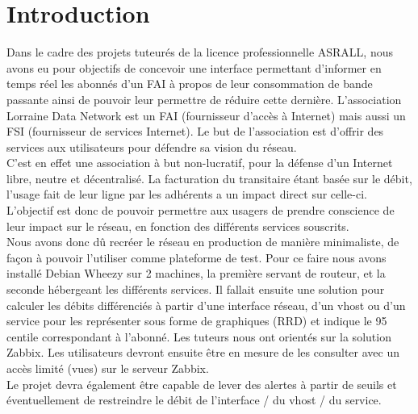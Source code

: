 \section{Introduction}
	\vspace{0.3cm}
	Dans le cadre des projets tuteurés de la licence professionnelle ASRALL, nous avons eu pour objectifs de concevoir une interface permettant d'informer en temps réel les abonnés d'un FAI à propos de leur consommation de bande passante ainsi de pouvoir leur permettre de réduire cette dernière. L'association Lorraine Data Network est un FAI (fournisseur d'accès à Internet) mais aussi un FSI (fournisseur de services Internet). Le but de l'association est d'offrir des services aux utilisateurs pour défendre sa vision du réseau.\\ 

	C'est en effet une association à but non-lucratif, pour la défense d'un Internet libre, neutre et décentralisé. La facturation du transitaire étant basée sur le débit, l'usage fait de leur ligne par les adhérents a un impact direct sur celle-ci. L'objectif est donc de pouvoir permettre aux usagers de prendre conscience de leur impact sur le réseau, en fonction des différents services souscrits.\\
	
	Nous avons donc dû recréer le réseau en production de manière minimaliste, de façon à pouvoir l'utiliser comme plateforme de test. Pour ce faire nous avons installé Debian Wheezy sur 2 machines, la première servant de routeur, et la seconde hébergeant les différents services. Il fallait ensuite une solution pour calculer les débits différenciés à partir d'une interface réseau, d'un vhost ou d'un service pour les représenter sous forme de graphiques (RRD) et indique le 95 centile correspondant à l'abonné. Les tuteurs nous ont orientés sur la solution Zabbix. Les utilisateurs devront ensuite être en mesure de les consulter avec un accès limité (vues) sur le serveur Zabbix.\\

Le projet devra également être capable de lever des alertes à partir de seuils et éventuellement de restreindre le débit de l'interface / du vhost / du service. 

\newpage
